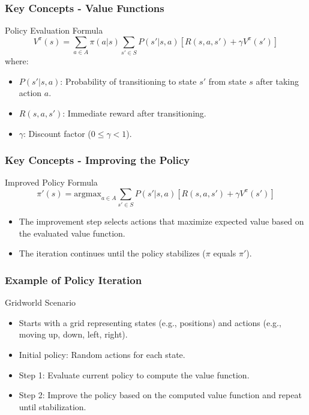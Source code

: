 \documentclass[aspectratio=169]{beamer}
\begin{document}
\begin{frame}[fragile]
    \frametitle{Key Concepts - Value Functions}
    \begin{block}{Policy Evaluation Formula}
        \begin{equation}
        V^\pi(s) = \sum_{a \in A} \pi(a|s) \sum_{s' \in S} P(s'|s, a) \left[ R(s, a, s') + \gamma V^\pi(s') \right]
        \end{equation}
        where:
        \begin{itemize}
            \item $P(s'|s, a)$: Probability of transitioning to state $s'$ from state $s$ after taking action $a$.
            \item $R(s, a, s')$: Immediate reward after transitioning.
            \item $\gamma$: Discount factor ($0 \leq \gamma < 1$).
        \end{itemize}
    \end{block}
\end{frame}

\begin{frame}[fragile]
    \frametitle{Key Concepts - Improving the Policy}
    \begin{block}{Improved Policy Formula}
        \begin{equation}
        \pi'(s) = \text{argmax}_{a \in A} \sum_{s' \in S} P(s'|s, a) \left[ R(s, a, s') + \gamma V^\pi(s') \right]
        \end{equation}
    \end{block}
    \begin{itemize}
        \item The improvement step selects actions that maximize expected value based on the evaluated value function.
        \item The iteration continues until the policy stabilizes ($\pi$ equals $\pi'$).
    \end{itemize}
\end{frame}

\begin{frame}[fragile]
    \frametitle{Example of Policy Iteration}
    \begin{block}{Gridworld Scenario}
        \begin{itemize}
            \item Starts with a grid representing states (e.g., positions) and actions (e.g., moving up, down, left, right).
            \item Initial policy: Random actions for each state.
            \item Step 1: Evaluate current policy to compute the value function.
            \item Step 2: Improve the policy based on the computed value function and repeat until stabilization.
        \end{itemize}
    \end{block}
\end{frame}
\end{document}
